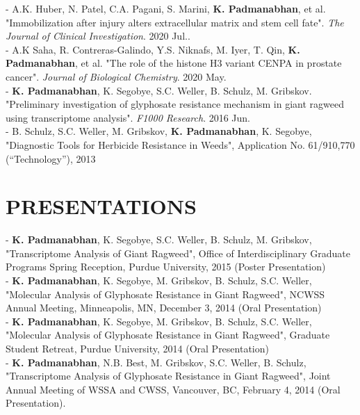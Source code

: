\documentclass[11pt,letterpaper,sans]{moderncv}        %
\begin{document}
{{{\begin{minipage}{\maincolumnwidth}
{	- A.K. Huber, N. Patel, C.A. Pagani, S. Marini, \textbf{K. Padmanabhan}, et al. "Immobilization after injury alters extracellular matrix and stem cell fate". \textit{The Journal of Clinical Investigation}. 2020 Jul..\\
          - A.K Saha, R. Contreras-Galindo, Y.S. Niknafs, M. Iyer, T. Qin, \textbf{K. Padmanabhan}, et al. "The role of the histone H3 variant CENPA in prostate cancer". \textit{Journal of Biological Chemistry}. 2020 May.\\
	- \textbf{K. Padmanabhan}, K. Segobye, S.C. Weller, B. Schulz, M. Gribskov. "Preliminary investigation of glyphosate resistance mechanism in giant ragweed using transcriptome analysis". \textit{F1000 Research}. 2016 Jun.\\
	- B. Schulz, S.C. Weller, M. Gribskov, \textbf{K. Padmanabhan}, K. Segobye, "Diagnostic Tools for Herbicide Resistance in Weeds", Application No. 61/910,770 (“Technology”), 2013
	}%
\end{minipage}%


\section{PRESENTATIONS}
\begin{minipage}{\maincolumnwidth}%
	\small{
	- \textbf{K. Padmanabhan}, K. Segobye, S.C. Weller, B. Schulz, M. Gribskov, "Transcriptome Analysis of Giant Ragweed", Office of Interdisciplinary Graduate Programs Spring Reception, Purdue University, 2015 (Poster Presentation)\\
	- \textbf{K. Padmanabhan}, K. Segobye, M. Gribskov, B. Schulz, S.C. Weller, "Molecular Analysis of Glyphosate Resistance in Giant Ragweed", NCWSS Annual Meeting, Minneapolis, MN, December 3, 2014 (Oral Presentation)\\
	- \textbf{K. Padmanabhan}, K. Segobye, M. Gribskov, B. Schulz, S.C. Weller, "Molecular Analysis of Glyphosate Resistance in Giant Ragweed", Graduate Student Retreat, Purdue University, 2014 (Oral Presentation)\\
          - \textbf{K. Padmanabhan}, N.B. Best, M. Gribskov, S.C. Weller, B. Schulz, "Transcriptome Analysis of Glyphosate Resistance in Giant Ragweed", Joint Annual Meeting of WSSA and CWSS, Vancouver, BC, February 4, 2014 (Oral Presentation).  
	}%
\end{minipage}%

}}}
\end{document}
